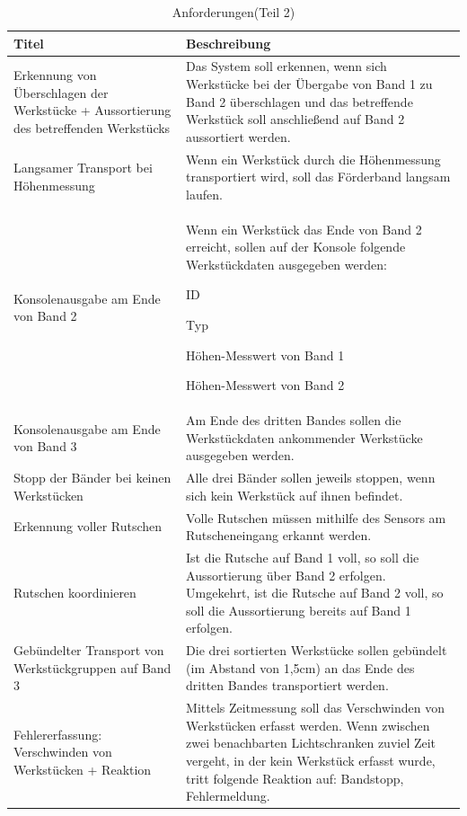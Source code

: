 \documentclass[a4paper, 11pt]{article}
\begin{document}
\newpage

\begin{table}[h]
\center
\begin{tabularx}{\textwidth}{|X|X|}
\hline
\textbf{Titel}&\textbf{Beschreibung}\\
\hline
Erkennung von Überschlagen der Werkstücke + Aussortierung des betreffenden Werkstücks&Das System soll erkennen, wenn sich Werkstücke bei der Übergabe von Band 1 zu Band 2 überschlagen und das betreffende Werkstück soll anschließend auf Band 2 aussortiert werden.\\
\hline
Langsamer Transport bei Höhenmessung&Wenn ein Werkstück durch die Höhenmessung transportiert wird, soll das Förderband langsam laufen.\\
\hline
Konsolenausgabe am Ende von Band 2&Wenn ein Werkstück das Ende von Band 2 erreicht, sollen auf der Konsole folgende Werkstückdaten ausgegeben werden:
\begin{compactenum}[-]
\item ID 
\item Typ 
\item Höhen-Messwert von Band 1 
\item Höhen-Messwert von Band 2 
\end{compactenum}\\
\hline
Konsolenausgabe am Ende von Band 3&Am Ende des dritten Bandes sollen die Werkstückdaten ankommender Werkstücke ausgegeben werden.\\
\hline
Stopp der Bänder bei keinen Werkstücken&Alle drei Bänder sollen jeweils stoppen, wenn sich kein Werkstück auf ihnen befindet.\\
\hline
Erkennung voller Rutschen&Volle Rutschen müssen mithilfe des Sensors am Rutscheneingang erkannt werden.\\
\hline
Rutschen koordinieren&Ist die Rutsche auf Band 1 voll, so soll die Aussortierung über Band 2 erfolgen. Umgekehrt, ist die Rutsche auf Band 2 voll, so soll die Aussortierung bereits auf Band 1 erfolgen.\\
\hline
Gebündelter Transport von Werkstückgruppen auf Band 3&Die drei sortierten Werkstücke sollen gebündelt (im Abstand von 1,5cm) an das Ende des dritten Bandes transportiert werden.\\
\hline
Fehlererfassung: Verschwinden von Werkstücken + Reaktion&Mittels Zeitmessung soll das Verschwinden von Werkstücken erfasst werden. Wenn zwischen zwei benachbarten Lichtschranken zuviel Zeit vergeht, in der kein Werkstück erfasst wurde, tritt folgende Reaktion auf: Bandstopp, Fehlermeldung.\\
\hline
\end{tabularx}
\caption{Anforderungen(Teil 2)}
\label{anf2}
\end{table}
\end{document}
